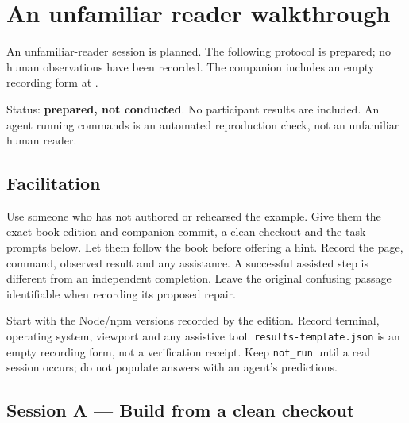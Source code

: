 \chapter{An unfamiliar reader walkthrough}\label{reader-walkthrough}

An unfamiliar-reader session is planned. The following protocol is prepared; no human observations have been recorded. The companion includes an empty recording form at .

Status: \textbf{prepared, not conducted}. No participant results are included. An agent running commands is an automated reproduction check, not an unfamiliar human reader.

\section{Facilitation}

Use someone who has not authored or rehearsed the example. Give them the exact book edition and companion commit, a clean checkout and the task prompts below. Let them follow the book before offering a hint. Record the page, command, observed result and any assistance. A successful assisted step is different from an independent completion. Leave the original confusing passage identifiable when recording its proposed repair.

Start with the Node/npm versions recorded by the edition. Record terminal, operating system, viewport and any assistive tool. \texttt{results-template.json} is an empty recording form, not a verification receipt. Keep \texttt{not\_run} until a real session occurs; do not populate answers with an agent's predictions.

\section{Session A — Build from a clean checkout}

